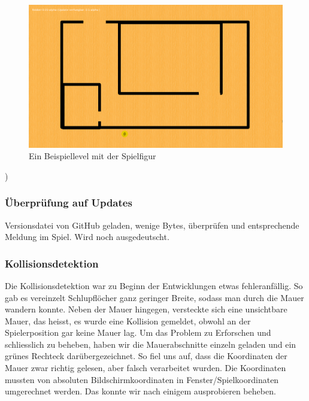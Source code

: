 \documentclass[12pt,a4paper]{scrartcl}
\begin{document}
\begin{figure}[h]
\centering
\includegraphics[scale=0.25]{img/grafiken.png}
\caption{Ein Beispiellevel mit der Spielfigur}
\end{figure}
)

\subsubsection{Überprüfung auf Updates}
Versionsdatei von GitHub geladen, wenige Bytes, überprüfen und entsprechende Meldung im Spiel.
Wird noch ausgedeutscht.

\subsubsection{Kollisionsdetektion}
Die Kollisionsdetektion war zu Beginn der Entwicklungen etwas fehleranfällig. So gab es vereinzelt
Schlupflöcher ganz geringer Breite, sodass man durch die Mauer wandern konnte. Neben der Mauer hingegen,
versteckte sich eine unsichtbare Mauer, das heisst, es wurde eine Kollision gemeldet, obwohl an der
Spielerposition gar keine Mauer lag. Um das Problem zu Erforschen und schliesslich zu beheben, haben
wir die Mauerabschnitte einzeln geladen und ein grünes Rechteck darübergezeichnet. So fiel uns auf, dass
die Koordinaten der Mauer zwar richtig gelesen, aber falsch verarbeitet wurden. Die Koordinaten mussten
von absoluten Bildschirmkoordinaten in Fenster/Spielkoordinaten umgerechnet werden. Das konnte wir nach einigem ausprobieren beheben.
\end{document}
